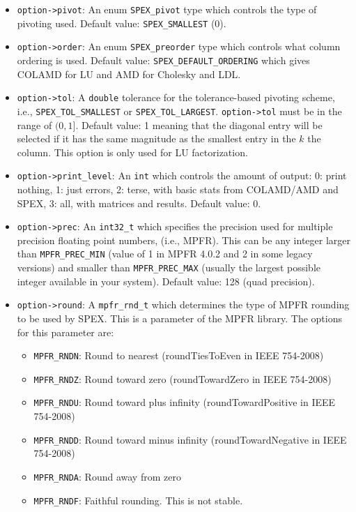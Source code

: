 \documentclass[12pt,oneside]{book}
\theoremstyle{definition}
\begin{document}
\begin{itemize}
    \item \verb|option->pivot|: An enum \verb|SPEX_pivot| type which controls the type of pivoting used. Default value: \verb|SPEX_SMALLEST| (0).

    \item \verb|option->order|: An enum \verb|SPEX_preorder| type which controls what column ordering is used. Default value: \verb|SPEX_DEFAULT_ORDERING| which gives COLAMD for LU and AMD for Cholesky and LDL.

    \item \verb|option->tol|: A \verb|double| tolerance for the tolerance-based pivoting scheme, i.e., \newline \verb|SPEX_TOL_SMALLEST| or \verb|SPEX_TOL_LARGEST|. \verb|option->tol| must be in the range of $(0,1]$. Default value: 1 meaning that the diagonal entry will be selected if it has the same magnitude as the smallest entry in the $k$ the column.  This option is only used for LU factorization.

    \item \verb|option->print_level|: An \verb|int| which controls the amount of output: 0: print nothing, 1: just errors, 2: terse, with basic stats from COLAMD/AMD and SPEX, 3: all, with matrices and results. Default value: 0.

    \item  \verb|option->prec|: An \verb|int32_t| which specifies the precision used for multiple precision floating point numbers, (i.e., MPFR). This can be any integer larger than \verb|MPFR_PREC_MIN| (value of 1 in MPFR 4.0.2 and 2 in some legacy versions) and smaller than \verb|MPFR_PREC_MAX| (usually the largest possible integer available in your system). Default value: 128 (quad precision).

    \item \verb|option->round|: A \verb|mpfr_rnd_t| which determines the type of MPFR rounding to be used by SPEX. This is a parameter of the MPFR library. The options for this parameter are:

    \begin{itemize}
        \item \verb|MPFR_RNDN|: Round to nearest (roundTiesToEven in IEEE 754-2008)
        \item \verb|MPFR_RNDZ|: Round toward zero (roundTowardZero in IEEE 754-2008)
        \item \verb|MPFR_RNDU|: Round toward plus infinity (roundTowardPositive in IEEE 754-2008)
        \item \verb|MPFR_RNDD|: Round toward minus infinity (roundTowardNegative in IEEE 754-2008)
        \item \verb|MPFR_RNDA|: Round away from zero 
        \item \verb|MPFR_RNDF|: Faithful rounding. This is not stable.
    \end{itemize}


\end{itemize}
\end{document}
